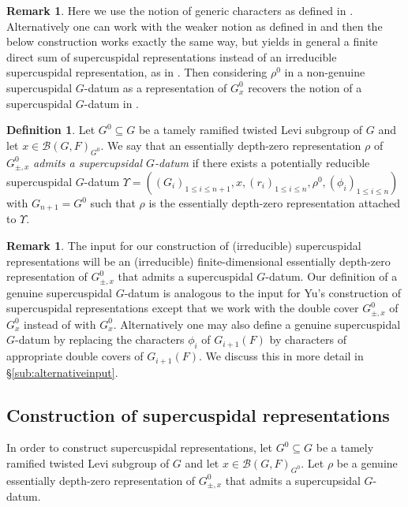 \documentclass{article}
\newcommand{\cB}{\mathcal{B}}
\theoremstyle{definition}
\newtheorem{rem}[thm]{Remark}
\newtheorem{dfn}[thm]{Definition}
\numberwithin{equation}{subsection}
\renewcommand{\-}{\hyp{}}
\begin{document}
\begin{rem}	
	Here we use the notion of generic characters as defined in \cite[Definition~3.8]{Fintzen-IHES}. Alternatively one can work with the weaker notion as defined in \cite[Definition~4.1.1]{FS25}
	and then the below construction works exactly the same way, but yields in general a finite direct sum of supercuspidal representations instead of an irreducible supercuspidal representation, as in \cite{FS25}. Then considering $\rho^0$ in a non-genuine supercuspidal $G$-datum as a representation of $G^0_x$ recovers the notion of a supercuspidal $G$-datum in \cite[\S4.1]{FS25}.
\end{rem}


\begin{dfn} Let $G^0 \subseteq G$ be a tamely ramified twisted Levi subgroup of $G$ and let $x \in \cB(G,F)_{G^0}$. We say that an essentially depth-zero representation $\rho$ of $G^0_{\pm, x}$ \emph{admits a supercupsidal $G$-datum} if there exists a potentially reducible supercuspidal $G$-datum  \(\Upsilon= ((G_i)_{1\leq i\leq n+1},x,(r_i)_{1\leq i\leq n},\rho^0,(\phi_i)_{1\leq i\leq n}) \) with $G_{n+1}=G^0$ such that $\rho$ is the essentially depth-zero representation attached to $\Upsilon$.	
\end{dfn}

 
 \begin{rem}
 	The input for our construction of (irreducible) supercuspidal representations will be an (irreducible) finite-dimensional essentially depth-zero representation of $G^0_{\pm, x}$ that admits a supercuspidal $G$-datum. Our definition of a genuine supercuspidal $G$-datum is analogous to the input for Yu's construction of supercuspidal representations \cite[\S3]{Yu01} except that we work with the double cover $G^0_{\pm, x}$ of $G^0_{x}$ instead of with $G^0_{x}$. Alternatively one may also define a genuine supercuspidal $G$-datum by replacing the characters $\phi_i$ of $G_{i+1}(F)$ by characters of appropriate double covers of $G_{i+1}(F)$. We discuss this in more detail in \S\ref{sub:alternativeinput}.
 \end{rem}



















 \subsection{Construction of supercuspidal representations} \label{sub:construction}
In order to construct supercuspidal representations, let $G^0 \subseteq G$ be a tamely ramified twisted Levi subgroup of $G$ and let $x \in \cB(G,F)_{G^0}$. Let $\rho$ be a genuine essentially depth-zero representation of $G^0_{\pm, x}$ that admits a supercupsidal $G$-datum.
\end{document}
